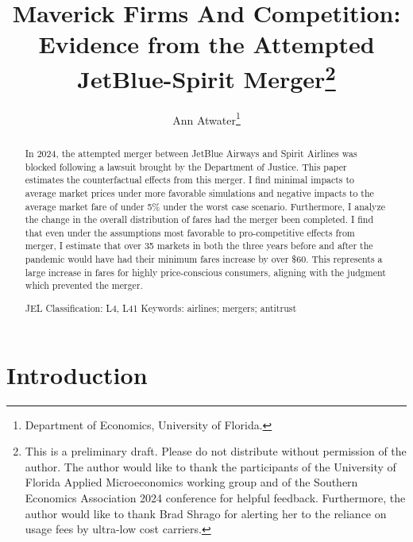 \documentclass{article}
\author{Ann Atwater\footnote{Department of Economics, University of Florida.}}
\title{Maverick Firms And Competition: Evidence from the Attempted JetBlue-Spirit Merger\footnote{This is a preliminary draft. Please do not distribute without permission of the author. The author would like to thank the participants of the University of Florida Applied Microeconomics working group and of the Southern Economics Association 2024 conference for helpful feedback. Furthermore, the author would like to thank Brad Shrago for alerting her to the reliance on usage fees by ultra-low cost carriers. }}
\begin{document}
	\maketitle
	
	\begin{abstract}
In 2024, the attempted merger between JetBlue Airways and Spirit Airlines was blocked following a lawsuit brought by the Department of Justice. This paper estimates the counterfactual effects from this merger. I find minimal impacts to average market prices under more favorable simulations and negative impacts to the average market fare of under 5\% under the worst case scenario. Furthermore, I analyze the change in the overall distribution of fares had the merger been completed. I find that even under the assumptions most favorable to pro-competitive effects from merger, I estimate that over 35 markets in both the three years before and after the pandemic would have had their minimum fares increase by over \$60. This represents a large increase in fares for highly price-conscious consumers, aligning with the judgment which prevented the merger. \bigskip

    \noindent JEL Classification: L4, L41 \newline
	\noindent Keywords: airlines; mergers; antitrust
		
	\end{abstract}
	
	\pagebreak
	
	\doublespacing
	
	\section{Introduction}
	\label{sec:Introduction} 

    

 
\end{document}
